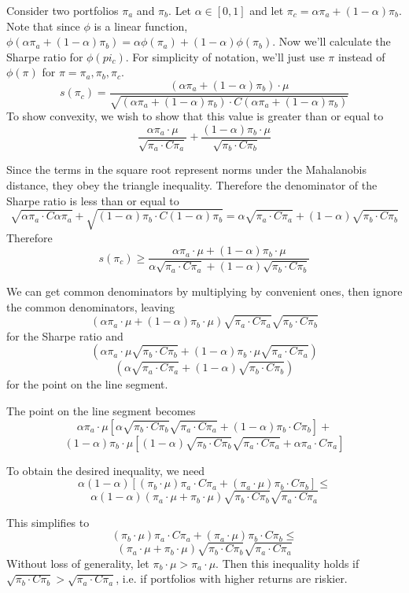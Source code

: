 \documentclass{article}
\begin{document}
Consider two portfolios $\pi_a$ and $\pi_b$.  Let $\alpha \in [0,1]$ and let $\pi_c = \alpha \pi_a + (1-\alpha)\pi_b$.  Note that since $\phi$ is a linear function, $\phi(\alpha \pi_a + (1-\alpha)\pi_b) = \alpha \phi(\pi_a) + (1-\alpha)\phi(\pi_b)$.
Now we'll calculate the Sharpe ratio for $\phi(pi_c)$.  For simplicity of notation, we'll just use $\pi$ instead of $\phi(\pi)$ for $\pi = \pi_a, \pi_b, \pi_c$.
\[s(\pi_c) = \frac{(\alpha \pi_a + (1-\alpha)\pi_b) \cdot \mu}{\sqrt{(\alpha \pi_a + (1-\alpha)\pi_b)\cdot C(\alpha \pi_a + (1-\alpha)\pi_b)}}\]
To show convexity, we wish to show that this value is greater than or equal to
\[\frac{\alpha \pi_a\cdot \mu }{\sqrt{\pi_a \cdot C \pi_a}} +\frac{ (1-\alpha) \pi_b\cdot \mu }{\sqrt{\pi_b \cdot C \pi_b}}\]


Since the terms in the square root represent norms under the Mahalanobis distance, they obey the triangle inequality.  Therefore the denominator of the Sharpe ratio is less than or equal to
\[\sqrt{\alpha \pi_a \cdot C\alpha \pi_a} +\sqrt{ (1-\alpha)\pi_b \cdot C(1-\alpha)\pi_b} = \alpha\sqrt{ \pi_a \cdot C \pi_a} +(1-\alpha) \sqrt{ \pi_b \cdot C\pi_b}\]
Therefore
\[s(\pi_c) \geq \frac{\alpha \pi_a \cdot \mu + (1-\alpha)\pi_b \cdot \mu}{\alpha\sqrt{ \pi_a \cdot C \pi_a} +(1-\alpha) \sqrt{ \pi_b \cdot C\pi_b}}\]


We can get common denominators by multiplying by convenient ones, then ignore the common denominators, leaving
\[(\alpha \pi_a \cdot \mu + (1-\alpha)\pi_b \cdot \mu)\sqrt{\pi_a \cdot C \pi_a}\sqrt{\pi_b \cdot C \pi_b}\]
for the Sharpe ratio and
\[(\alpha \pi_a \cdot \mu \sqrt{\pi_b \cdot C \pi_b} + (1-\alpha) \pi_b\cdot \mu \sqrt{\pi_a \cdot C \pi_a})\]
\[(\alpha\sqrt{ \pi_a \cdot C \pi_a} +(1-\alpha) \sqrt{ \pi_b \cdot C\pi_b})\]
for the point on the line segment.

The point on the line segment becomes
\[\alpha\pi_a \cdot \mu [\alpha \sqrt{\pi_b \cdot C \pi_b} \sqrt{\pi_a \cdot C \pi_a} + (1-\alpha) \pi_b \cdot C\pi_b ]+\]
\[(1-\alpha)\pi_b \cdot \mu [(1-\alpha) \sqrt{\pi_b \cdot C \pi_b} \sqrt{\pi_a \cdot C \pi_a} + \alpha \pi_a \cdot C\pi_a ]\]

To obtain the desired inequality, we need 
\[\alpha(1-\alpha)[(\pi_b \cdot \mu )\pi_a \cdot C\pi_a + ( \pi_a \cdot \mu )\pi_b \cdot C\pi_b ] \leq\]
\[\alpha(1-\alpha)(\pi_a \cdot \mu + \pi_b \cdot \mu)\sqrt{\pi_b \cdot C \pi_b} \sqrt{\pi_a \cdot C \pi_a} \]


This simplifies to
\[(\pi_b \cdot \mu )\pi_a \cdot C\pi_a + ( \pi_a \cdot \mu )\pi_b \cdot C\pi_b  \leq \]
\[(\pi_a \cdot \mu + \pi_b \cdot \mu)\sqrt{\pi_b \cdot C \pi_b} \sqrt{\pi_a \cdot C \pi_a} \]
Without loss of generality, let $\pi_b \cdot \mu > \pi_a \cdot \mu$.  Then this inequality holds if $\sqrt{\pi_b \cdot C \pi_b} > \sqrt{\pi_a \cdot C \pi_a}$, i.e. if portfolios with higher returns are riskier. 
\end{document}
